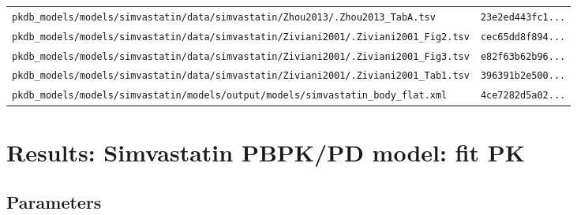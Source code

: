 \begin{longtable}{ll}
\texttt{pkdb\_models/models/simvastatin/data/simvastatin/Zhou2013/.Zhou2013\_TabA.tsv} & \texttt{23e2ed443fc1...} \\
\texttt{pkdb\_models/models/simvastatin/data/simvastatin/Ziviani2001/.Ziviani2001\_Fig2.tsv} & \texttt{cec65dd8f894...} \\
\texttt{pkdb\_models/models/simvastatin/data/simvastatin/Ziviani2001/.Ziviani2001\_Fig3.tsv} & \texttt{e82f63b62b96...} \\
\texttt{pkdb\_models/models/simvastatin/data/simvastatin/Ziviani2001/.Ziviani2001\_Tab1.tsv} & \texttt{396391b2e500...} \\
\texttt{pkdb\_models/models/simvastatin/models/output/models/simvastatin\_body\_flat.xml} & \texttt{4ce7282d5a02...} \\
\end{longtable}

\section{Results: Simvastatin PBPK/PD model: fit PK}

\subsection{Parameters}

